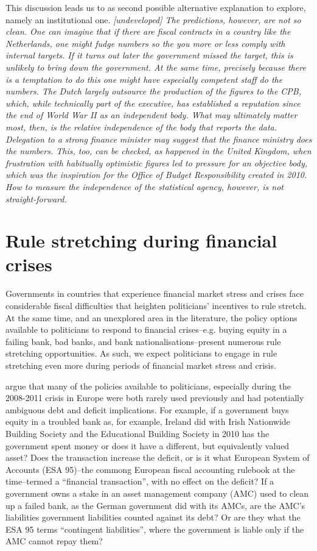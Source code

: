 \documentclass[]{article}
\begin{document}
This discussion leads us to as second possible alternative explanation to explore, namely an  institutional one. \emph{[undeveloped]  The predictions, however, are not so clean. One can imagine that if there are fiscal contracts in a country like the Netherlands, one might fudge numbers so the you more or less comply with internal targets. If it turns out later the government missed the target, this is unlikely to bring down the government. At the same time, precisely because  there is a temptation to do this one might have especially competent staff do the numbers. The Dutch largely outsource the production of the figures to the CPB, which, while technically part of the executive, has established a reputation since the end of World War II as an independent body. What may ultimately matter most, then, is the relative independence of the body that reports the data. Delegation to a strong finance minister may suggest that the finance ministry does the numbers. This, too, can be checked, as happened in the United Kingdom, when frustration with habitually optimistic figures led to pressure for an objective body, which was the inspiration for the Office of Budget Responsibility created in 2010. How to measure the independence of the statistical agency, however, is not straight-forward.}

\section{Rule stretching during financial crises}

Governments in countries that experience financial market stress and crises face considerable fiscal difficulties \cite[see][]{Laeven2012} that heighten politicians' incentives to rule stretch. At the same time, and an unexplored area in the literature, the policy options available to politicians to respond to financial crises--e.g. buying equity in a failing bank, bad banks, and bank nationalisations--present numerous rule stretching opportunities. As such, we expect politicians to engage in rule stretching even more during periods of financial market stress and crisis.

\cite{GandrudHallerberg2016} argue that many of the policies available to politicians, especially during the 2008-2011 crisis in Europe were both rarely used previously and had potentially ambiguous debt and deficit implications. For example, if a government buys equity in a troubled bank as, for example, Ireland did with Irish Nationwide Building Society and the Educational Building Society in 2010 has the government spent money or does it have a different, but equivalently valued asset? Does the transaction increase the deficit, or is it what European System of Accounts (ESA 95)--the commong European fiscal accounting rulebook at the time--termed a ``financial transaction'', with no effect on the deficit? If a government owns a stake in an asset management company (AMC) used to clean up a failed bank, as the German government did with its AMCs, are the AMC's liabilities government liabilities counted against its debt? Or are they what the ESA 95 terms ``contingent liabilities'', where the government is liable only if the AMC cannot repay them?
\end{document}
